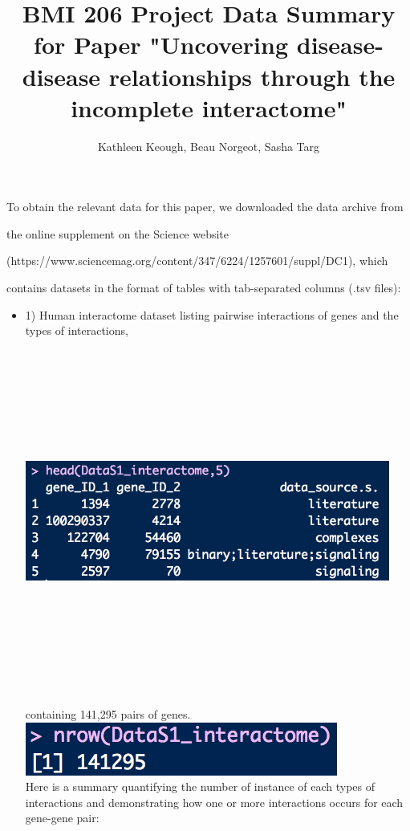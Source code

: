 \documentclass[11pt, oneside]{article}   	%
\title{BMI 206 Project Data Summary for Paper "Uncovering disease-disease relationships through the incomplete interactome"}
\author{Kathleen Keough, Beau Norgeot, Sasha Targ}
\date{}							%
\begin{document}
\maketitle


To obtain the relevant data for this paper, we downloaded the data archive from 

the online supplement on the Science website 

(https://www.sciencemag.org/content/347/6224/1257601/suppl/DC1), which 

contains datasets in the format of tables with tab-separated columns (.tsv files):\begin{itemize} 

\item1) Human interactome dataset listing pairwise interactions of genes and the types of interactions,\\
\includegraphics[width=12cm,height=12cm,keepaspectratio]{DataS1.png} containing 141,295 pairs of genes.\\
 \includegraphics{nrows_interactome.png} \\Here is a summary quantifying the number of instance of each types of interactions and demonstrating how one or more interactions occurs for each gene-gene pair: \\

\end{itemize}
\end{document}
